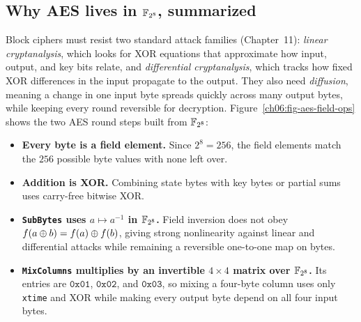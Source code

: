 \subsection{Why AES lives in $\mathbb{F}_{2^8}$, summarized}
\label{ch06:why-aes}

Block ciphers must resist two standard attack families (Chapter~11):
\emph{linear cryptanalysis}, which looks for XOR equations that approximate how
input, output, and key bits relate, and \emph{differential cryptanalysis},
which tracks how fixed XOR differences in the input propagate to the output.
They also need \emph{diffusion}, meaning a change in one input byte spreads
quickly across many output bytes, while keeping every round reversible for
decryption. Figure~\ref{ch06:fig-aes-field-ops} shows the two AES round steps
built from $\mathbb{F}_{2^8}$:

\begin{itemize}
  \item \textbf{Every byte is a field element.} Since $2^8 = 256$, the field
        elements match the $256$ possible byte values with none left over.
  \item \textbf{Addition is XOR.} Combining state bytes with key bytes or
        partial sums uses carry-free bitwise XOR.
  \item \textbf{\texttt{SubBytes} uses $a \mapsto a^{-1}$ in $\mathbb{F}_{2^8}$.} Field
        inversion does not obey $f(a \oplus b) = f(a) \oplus f(b)$, giving strong
        nonlinearity against linear and differential attacks while remaining a
        reversible one-to-one map on bytes.
  \item \textbf{\texttt{MixColumns} multiplies by an invertible $4\times 4$
        matrix over $\mathbb{F}_{2^8}$.} Its entries are $\texttt{0x01}$,
        $\texttt{0x02}$, and $\texttt{0x03}$, so mixing a four-byte column uses
        only \texttt{xtime} and XOR while making every output byte depend on
        all four input bytes.
\end{itemize}

